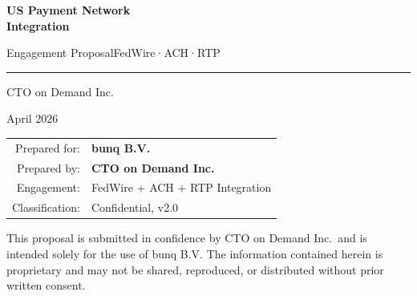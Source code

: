 \documentclass[11pt,letterpaper]{article}
\begin{document}
\begin{titlepage}
\setlength{\parskip}{0pt}%
\centering
\vspace*{1.8in}
{\fontsize{28}{36}\selectfont\bfseries\sffamily\textcolor{ReedNavy}{US Payment Network\\Integration}\par}
\vspace{8mm}
{\Large\sffamily\textcolor{ReedMuted}{Engagement Proposal\quad\textbar\quad FedWire\enspace·\enspace ACH\enspace·\enspace RTP}\par}
\vspace{6mm}
{\color{ReedCyan}\rule{6cm}{0.6pt}\par}
\vspace{8mm}
{\large\sffamily\textcolor{ReedNavy}{CTO on Demand Inc.}\par}
\vspace{4mm}
{\sffamily\textcolor{ReedMuted}{April 2026}\par}

\vfill

\begin{tabular}{@{}r@{\quad}l@{}}
\textcolor{ReedMuted}{\sffamily Prepared for:} & \textsf{\textbf{bunq B.V.}} \\[4pt]
\textcolor{ReedMuted}{\sffamily Prepared by:} & \textsf{\textbf{CTO on Demand Inc.}} \\[4pt]
\textcolor{ReedMuted}{\sffamily Engagement:} & \textsf{FedWire + ACH + RTP Integration} \\[4pt]
\textcolor{ReedMuted}{\sffamily Classification:} & \textsf{Confidential, v2.0} \\
\end{tabular}

\vspace{1.5cm}

{\small\color{ReedMuted} This proposal is submitted in confidence by CTO on Demand Inc.\ and is intended solely for the use of bunq B.V. The information contained herein is proprietary and may not be shared, reproduced, or distributed without prior written consent.}

\end{titlepage}
\setcounter{page}{1}

\newpage

{%
\setlength{\parskip}{0pt}%
\renewcommand{\baselinestretch}{0.95}%
\tableofcontents
}
\newpage













\end{document}
